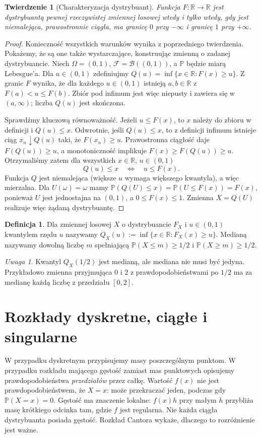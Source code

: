 \documentclass[11pt,a4paper,oneside]{report}
\numberwithin{equation}{chapter}
\theoremstyle{plain}
\newtheorem{twierdzenie}{Twierdzenie}[chapter]
\theoremstyle{definition}
\newtheorem{definicja}{Definicja}[chapter]
\theoremstyle{remark}
\newtheorem{uwaga}{Uwaga}[chapter]
\newcommand{\R}{\mathbb{R}}
\newcommand{\Prob}{\mathbb{P}}
\begin{document}
\begin{twierdzenie}[Charakteryzacja dystrybuant]
Funkcja $F:\R\to\R$ jest dystrybuantą pewnej rzeczywistej
zmiennej losowej wtedy i tylko wtedy, gdy jest niemalejąca,
prawostronnie ciągła, ma granicę $0$ przy $-\infty$
i granicę $1$ przy $+\infty$.
\end{twierdzenie}
\begin{proof}
Konieczność wszystkich warunków wynika z poprzedniego
twierdzenia. Pokażemy, że są one także wystarczające,
konstruując zmienną o zadanej dystrybuancie.
Niech $\Omega=(0,1)$, $\mathcal F=\mathcal B((0,1))$,
a $\Prob$ będzie miarą Lebesgue'a.
Dla $u\in(0,1)$ zdefiniujmy
$Q(u)=\inf\{x\in\R:F(x)\geq u\}$.
Z granic $F$ wynika, że dla każdego $u\in(0,1)$
istnieją $a,b\in\R$ z $F(a)<u\leq F(b)$.
Zbiór pod infimum jest więc niepusty i zawiera się
w $(a,\infty)$; liczba $Q(u)$ jest skończona.

Sprawdźmy kluczową równoważność. Jeżeli $u\leq F(x)$,
to $x$ należy do zbioru w definicji i $Q(u)\leq x$.
Odwrotnie, jeśli $Q(u)\leq x$, to z definicji infimum
istnieje ciąg $x_n\downarrow Q(u)$ taki, że
$F(x_n)\geq u$. Prawostronna ciągłość daje
$F(Q(u))\geq u$, a monotoniczność implikuje
$F(x)\geq F(Q(u))\geq u$.
Otrzymaliśmy zatem dla wszystkich $x\in\R$, $u\in(0,1)$
\[
Q(u)\leq x\quad\Longleftrightarrow\quad u\leq F(x).
\]
Funkcja $Q$ jest niemalejąca (większe $u$ wymaga
większego kwantyla), a więc mierzalna.
Dla $U(\omega)=\omega$ mamy
$\Prob(Q(U)\leq x)=\Prob(U\leq F(x))=F(x)$,
ponieważ $U$ jest jednostajna na $(0,1)$, a $0\leq F(x)\leq1$.
Zmienna $X=Q(U)$ realizuje więc żądaną dystrybuantę.
\end{proof}

\begin{definicja}
Dla zmiennej losowej $X$ o dystrybuancie $F_X$ i $u\in(0,1)$
kwantylem rzędu $u$ nazywamy
$Q_X(u):=\inf\{x\in\R:F_X(x)\geq u\}$.
Medianą nazywamy dowolną liczbę $m$ spełniającą
$\Prob(X\leq m)\geq1/2$ i $\Prob(X\geq m)\geq1/2$.
\end{definicja}

\begin{uwaga}
Kwantyl $Q_X(1/2)$ jest medianą, ale mediana nie musi być jedyna.
Przykładowo zmienna przyjmująca $0$ i $2$ z prawdopodobieństwami
po $1/2$ ma za medianę każdą liczbę z przedziału $[0,2]$.
\end{uwaga}

\section{Rozkłady dyskretne, ciągłe i singularne}
W przypadku dyskretnym przypisujemy masy poszczególnym punktom.
W przypadku rozkładu mającego gęstość zamiast mas punktowych
opisujemy prawdopodobieństwa \emph{przedziałów} przez całkę.
Wartość $f(x)$ nie jest prawdopodobieństwem, że $X=x$:
może przekraczać jeden, podczas gdy $\Prob(X=x)=0$.
Gęstość ma znaczenie lokalne: $f(x)h$ przy małym $h$
przybliża masę krótkiego odcinka tam, gdzie $f$ jest regularna.
Nie każda ciągła dystrybuanta posiada gęstość. Rozkład Cantora
wykaże, dlaczego to rozróżnienie jest ważne.
\end{document}

